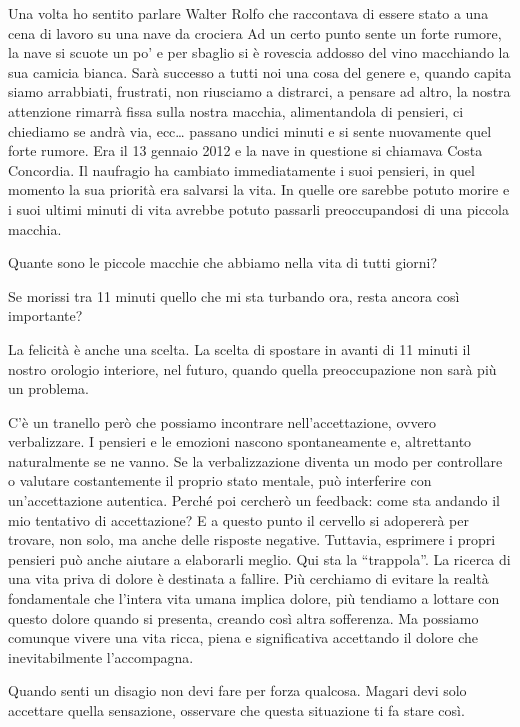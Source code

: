 \documentclass[12pt]{book} %
\begin{document}
Una volta ho sentito parlare Walter Rolfo che raccontava di essere stato a una cena di lavoro su una nave da crociera Ad
un certo punto sente un forte rumore, la nave si scuote un po' e per sbaglio si è rovescia addosso del vino macchiando
la sua camicia bianca. Sarà successo a tutti noi una cosa del genere e, quando capita siamo arrabbiati, frustrati, non
riusciamo a distrarci, a pensare ad altro, la nostra attenzione rimarrà fissa sulla nostra macchia, alimentandola di
pensieri, ci chiediamo se andrà via, ecc… passano undici minuti e si sente nuovamente quel forte rumore. Era il 13
gennaio 2012 e la nave in questione si chiamava Costa Concordia. Il naufragio ha cambiato immediatamente i suoi
pensieri, in quel momento la sua priorità era salvarsi la vita. In quelle ore sarebbe potuto morire e i suoi ultimi
minuti di vita avrebbe potuto passarli preoccupandosi di una piccola macchia.

Quante sono le piccole macchie che abbiamo nella vita di tutti giorni?

Se morissi tra 11 minuti quello che mi sta turbando ora, resta ancora così importante?

La felicità è anche una scelta. La scelta di spostare in avanti di 11 minuti il nostro orologio
interiore, nel futuro, quando quella preoccupazione non sarà più un problema.

C'è un tranello però che possiamo incontrare nell'accettazione, ovvero verbalizzare. I pensieri e
le emozioni nascono spontaneamente e, altrettanto naturalmente se ne vanno. Se la verbalizzazione diventa un modo per controllare o valutare costantemente il proprio stato mentale, può interferire con un’accettazione autentica. Perché poi cercherò un feedback: come sta andando il mio tentativo di accettazione? E a questo punto il cervello si adopererà per trovare, non solo, ma anche
delle risposte negative. Tuttavia, esprimere i propri pensieri può anche aiutare a elaborarli meglio. Qui sta la “trappola”. La ricerca di una vita priva di dolore è destinata a fallire. Più
cerchiamo di evitare la realtà fondamentale che l'intera vita umana implica dolore, più tendiamo a
lottare con questo dolore quando si presenta, creando così altra sofferenza. Ma possiamo comunque vivere una vita
ricca, piena e significativa accettando il dolore che inevitabilmente l'accompagna.

Quando senti un disagio non devi fare per forza qualcosa. Magari devi solo accettare quella sensazione, osservare che
questa situazione ti fa stare così.
\end{document}

